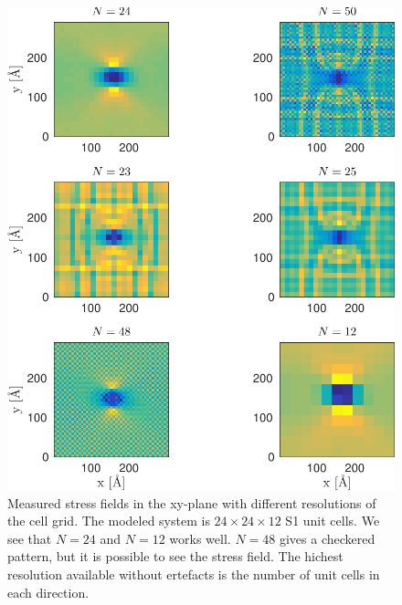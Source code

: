 \begin{figure}
\includegraphics[width=\textwidth]{../figures/thesis/stressfield_artefacts.pdf}
\caption{Measured stress fields in the xy-plane with different resolutions of the cell grid. The modeled system is $24\times 24\times 12$ S1 unit cells. We see that $N=24$ and $N=12$ works well. $N=48$ gives a checkered pattern, but it is possible to see the stress field. The hichest resolution available without ertefacts is the number of unit cells in each direction.}
\end{figure}